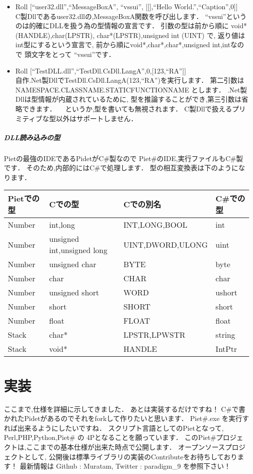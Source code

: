 \begin{itemize}
\item
  Roll {[}``user32.dll'',``MessageBoxA'', ``vssui'', {[}{[}{]},``Hello
  World.'',``Caption'',0{]}{]}\\C製Dllであるuser32.dllの,MessageBoxA関数を呼び出します．
  ``vssui''というのは的確にDLLを扱う為の型情報の宣言です．
  引数の型は前から順に void*(HANDLE),char(LPSTR),
  char*(LPSTR),unsigned int (UINT) で,
  返り値はint型にするという宣言で,
  前から順にvoid*,char*,char*,unsigned int,intなので 頭文字をとって
  ``vssui''です．
\item
  Roll
  {[}``TestDLL.dll'',``TestDll.CsDll.LangA'',0,{[}123,``RA''{]}{]}\\自作.Net製DllでTestDll.CsDll.LangA(123,``RA'')を実行します．
  第二引数は NAMESPACE.CLASSNAME.STATICFUNCTIONNAME とします．
  .Net製Dllは型情報が内蔵されているために,
  型を推論することができ,第三引数は省略できます．
  　というか,型を書いても無視されます．
  C製Dllで扱えるプリミティブな型以外はサポートしません．
\end{itemize}

\subparagraph{DLL読み込みの型}

Pietの最強のIDEであるPidetがC\#製なので
Piet\#のIDE,実行ファイルもC\#製です． そのため,内部的にはC\#で処理します．
型の相互変換表は下のようになります．

\begin{table}[htb]
    \begin{tabular}{llll}
      Pietでの型 & Cでの型 & Cでの別名 & C\#での型 \\ \hline \hline
      Number & int,long & INT,LONG,BOOL & int \\
      Number & unsigned int,unsigned long & UINT,DWORD,ULONG & uint \\
      Number & unsigned char & BYTE & byte \\
      Number & char & CHAR &char \\
      Number & unsigned short & WORD &ushort \\
      Number & short & SHORT & short \\
      Number & float & FLOAT & float \\
      Stack & char* & LPSTR,LPWSTR & string \\
      Stack & void* & HANDLE & IntPtr
    \end{tabular}
\end{table}

\section{実装}

ここまで,仕様を詳細に示してきました． あとは実装するだけですね！
C\#で書かれたPidetがあるのでそれをforkして作りたいと思います． Piet\#.exe
を実行すれば出来るようにしたいですね．
スクリプト言語としてのPietとなって, Perl,PHP,Python,Piet\# の
4Pとなることを願っています．
このPiet\#プロジェクトは,ここまでの基本仕様が出来た時点で公開します．
オープンソースプロジェクトとして,
公開後は標準ライブラリの実装のContributeをお待ちしております！ 最新情報は
Github : Muratam, Twitter : paradigm\_9 を参照下さい！
